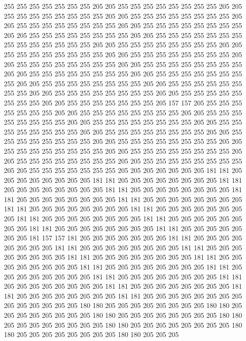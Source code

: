 255 255 255 255 255 255 255 205 205 255 255 255 255 255 255 255 255 205 205 255
255 255 255 255 255 255 255 205 205 255 255 255 255 255 255 255 255 205 205 255
255 255 255 255 255 255 255 205 205 255 255 255 255 255 255 255 255 205 205 255
255 255 255 255 255 255 255 205 205 255 255 255 255 255 255 255 255 255 255 255
255 255 255 205 205 255 255 255 255 255 255 255 255 205 205 255 255 255 255 255
255 255 255 205 205 255 255 255 255 255 255 255 255 205 205 255 255 255 255 255
255 255 255 205 205 255 255 255 255 255 255 255 255 205 205 255 255 255 255 255
255 255 255 205 205 255 255 255 255 255 255 255 255 205 205 255 255 255 255 255
255 255 255 205 205 255 255 255 255 255 255 255 255 205 205 255 255 255 255 255
255 255 255 205 205 255 255 255 255 255 255 255 255 205 205 255 255 255 255 255
255 255 205 157 157 205 255 255 255 255 255 255 255 205 205 255 255 255 255 255
255 255 255 205 205 255 255 255 255 255 255 255 255 205 205 255 255 255 255 255
255 255 255 205 205 255 255 255 255 255 255 255 255 205 205 255 255 255 255 255
255 255 255 205 205 255 255 255 255 255 255 255 255 205 205 255 255 255 255 255
255 255 255 205 205 255 255 255 255 255 255 255 255 205 205 255 255 255 255 255
255 255 255 205 205 255 255 255 255 255 255 255 255 205 205 255 255 255 255 255
255 255 255 205 205 255 255 255 255 255 255 255 205 205 205 205 205 205 205 181
181 205 205 205 205 205 205 205 205 181 181 205 205 205 205 205 205 205 205 181
181 205 205 205 205 205 205 205 205 181 181 205 205 205 205 205 205 205 205 181
181 205 205 205 205 205 205 205 205 181 181 205 205 205 205 205 205 205 205 181
181 205 205 205 205 205 205 205 205 181 181 205 205 205 205 205 205 205 205 181
181 205 205 205 205 205 205 205 205 181 181 205 205 205 205 205 205 205 205 181
181 205 205 205 205 205 205 205 205 181 181 205 205 205 205 205 205 205 181 157
157 181 205 205 205 205 205 205 205 181 181 205 205 205 205 205 205 205 205 181
181 205 205 205 205 205 205 205 205 181 181 205 205 205 205 205 205 205 205 181
181 205 205 205 205 205 205 205 205 181 181 205 205 205 205 205 205 205 205 181
181 205 205 205 205 205 205 205 205 181 181 205 205 205 205 205 205 205 205 181
181 205 205 205 205 205 205 205 205 181 181 205 205 205 205 205 205 205 205 181
181 205 205 205 205 205 205 205 205 181 181 205 205 205 205 205 205 205 205 181
181 205 205 205 205 205 205 205 205 205 205 205 205 205 205 180 180 205 205 205
205 205 205 205 205 180 180 205 205 205 205 205 205 205 205 180 180 205 205 205
205 205 205 205 205 180 180 205 205 205 205 205 205 205 205 180 180 205 205 205
205 205 205 205 205 180 180 205 205 205 205 205 205 205 205 180 180 205 205 205
